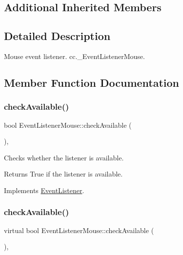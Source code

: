 \subsection*{Additional Inherited Members}


\subsection{Detailed Description}
Mouse event listener.  cc.\+\_\+\+Event\+Listener\+Mouse. 

\subsection{Member Function Documentation}
\mbox{\label{classEventListenerMouse_ac60e3ef56883beeb2f8660c921421e63}} 
\subsubsection{\texorpdfstring{check\+Available()}{checkAvailable()}\hspace{0.1cm}{\footnotesize\ttfamily [1/2]}}
{\footnotesize\ttfamily bool Event\+Listener\+Mouse\+::check\+Available (\begin{DoxyParamCaption}{ }\end{DoxyParamCaption})\hspace{0.3cm}{\ttfamily [override]}, {\ttfamily [virtual]}}

Checks whether the listener is available.

\begin{DoxyReturn}{Returns}
True if the listener is available. 
\end{DoxyReturn}


Implements \hyperlink{classEventListener_adf9e4eb37ea6e94c05f4d1b6594bd35e}{Event\+Listener}.

\mbox{\label{classEventListenerMouse_acf0e2a02290738775a08c6032c741d38}} 
\subsubsection{\texorpdfstring{check\+Available()}{checkAvailable()}\hspace{0.1cm}{\footnotesize\ttfamily [2/2]}}
{\footnotesize\ttfamily virtual bool Event\+Listener\+Mouse\+::check\+Available (\begin{DoxyParamCaption}{ }\end{DoxyParamCaption})\hspace{0.3cm}{\ttfamily [override]}, {\ttfamily [virtual]}}

